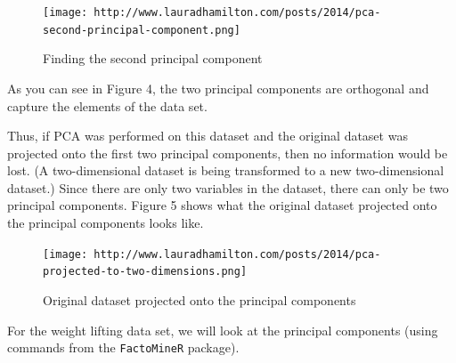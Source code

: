 \documentclass[12pt,twoside]{reedthesis}
\begin{document}
  \begin{figure}[htbp]
  \centering
  \texttt{[image: http://www.lauradhamilton.com/posts/2014/pca-second-principal-component.png]}
  \caption{Finding the second principal component}
  \end{figure}
  
  As you can see in Figure 4, the two principal components are orthogonal
  and capture the elements of the data set.
  
  \newpage
  
  Thus, if PCA was performed on this dataset and the original dataset was
  projected onto the first two principal components, then no information
  would be lost. (A two-dimensional dataset is being transformed to a new
  two-dimensional dataset.) Since there are only two variables in the
  dataset, there can only be two principal components. Figure 5 shows what
  the original dataset projected onto the principal components looks like.
  
  \begin{figure}[htbp]
  \centering
  \texttt{[image: http://www.lauradhamilton.com/posts/2014/pca-projected-to-two-dimensions.png]}
  \caption{Original dataset projected onto the principal components}
  \end{figure}
  
  \newpage
  
  For the weight lifting data set, we will look at the principal
  components (using commands from the \texttt{FactoMineR} package).
  
  \begin{Shaded}
  \begin{Highlighting}[]
  \StringTok{ }\NormalTok{(wl2[, -}\NormalTok{(}\NormalTok{,}\NormalTok{,}\NormalTok{)], } \NormalTok{)}
  \end{Highlighting}
  \end{Shaded}
  
\end{document}
